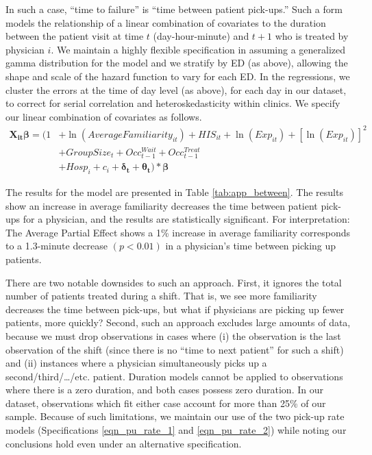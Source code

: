  In such a case, “time to failure” is “time between patient pick-ups.” Such a form models the relationship of a linear combination of covariates to the duration between the patient visit at time $t$ (day-hour-minute) and $t+1$ who is treated by physician $i$. We maintain a highly flexible specification in assuming a generalized gamma distribution for the model and we stratify by ED (as above), allowing the shape and scale of the hazard function to vary for each ED. In the regressions, we cluster the errors at the time of day level (as above), for each day in our dataset, to correct for serial correlation and heteroskedasticity within clinics. We specify our linear combination of covariates as follows.
  \begin{equation} \begin{split} %
        \boldsymbol{X_{it}}\boldsymbol{\beta} = (1 & + \ln(AverageFamiliarity_{it}) + HIS_{it} + \ln(Exp_{it}) + [\ln(Exp_{it})]^2 \\
        & + GroupSize_t + Occ_{t-1}^{Wait} + Occ_{t-1}^{Treat}   \\
        & + Hosp_i + c_i + \boldsymbol{\delta_t} + \boldsymbol{\theta_t} ) * \boldsymbol{\beta}
  \end{split}  \end{equation}
 
 The results for the model are presented in Table \ref{tab:app_between}. The results show an increase in average familiarity decreases the time between patient pick-ups for a physician, and the results are statistically significant. For interpretation: The Average Partial Effect shows a 1\% increase in average familiarity corresponds to a 1.3-minute decrease $(p < 0.01)$ in a physician’s time between picking up patients.
 
 There are two notable downsides to such an approach. First, it ignores the total number of patients treated during a shift. That is, we see more familiarity decreases the time between pick-ups, but what if physicians are picking up fewer patients, more quickly? Second, such an approach excludes large amounts of data, because we must drop observations in cases where (i) the observation is the last observation of the shift (since there is no “time to next patient” for such a shift) and (ii) instances where a physician simultaneously picks up a second/third/…/etc. patient. Duration models cannot be applied to observations where there is a zero duration, and both cases possess zero duration. In our dataset, observations which fit either case account for more than 25\% of our sample. Because of such limitations, we maintain our use of the two pick-up rate models (Specifications \ref{eqn_pu_rate_1} and \ref{eqn_pu_rate_2}) while noting our conclusions hold even under an alternative specification.
 
